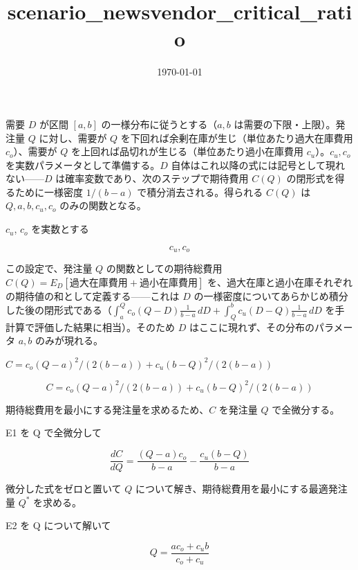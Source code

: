 \documentclass[dvipdfmx,a4paper,11pt]{jsarticle}
\title{scenario\_newsvendor\_critical\_ratio}
\date{\today}
\begin{document}
\maketitle

需要 $D$ が区間 $[a,b]$ の一様分布に従うとする（$a,b$ は需要の下限・上限）。発注量 $Q$ に対し、需要が $Q$ を下回れば余剰在庫が生じ（単位あたり過大在庫費用 $c_o$）、需要が $Q$ を上回れば品切れが生じる（単位あたり過小在庫費用 $c_u$）。$c_u,c_o$ を実数パラメータとして準備する。$D$ 自体はこれ以降の式には記号として現れない——$D$ は確率変数であり、次のステップで期待費用 $C(Q)$ の閉形式を得るために一様密度 $1/(b-a)$ で積分消去される。得られる $C(Q)$ は $Q,a,b,c_u,c_o$ のみの関数となる。

$c_u$, $c_o$ を実数とする

\[
  c_u, c_o
\]

この設定で、発注量 $Q$ の関数としての期待総費用 $C(Q)=E_D[\text{過大在庫費用}+\text{過小在庫費用}]$ を、過大在庫と過小在庫それぞれの期待値の和として定義する——これは $D$ の一様密度についてあらかじめ積分した後の閉形式である（$\int_a^Q c_o(Q-D)\frac1{b-a}\,dD+\int_Q^b c_u(D-Q)\frac1{b-a}\,dD$ を手計算で評価した結果に相当）。そのため $D$ はここに現れず、その分布のパラメータ $a,b$ のみが現れる。

$C = c_o (Q - a)^2 / (2 (b - a)) + c_u (b - Q)^2 / (2 (b - a))$

\begin{equation}
  C = c_o (Q - a)^2 / (2 (b - a)) + c_u (b - Q)^2 / (2 (b - a))
  \label{eq:E1}
\end{equation}

期待総費用を最小にする発注量を求めるため、$C$ を発注量 $Q$ で全微分する。

E1 を Q で全微分して

\begin{equation}
  \frac{dC}{dQ} = \frac{\left(Q-a\right) c_{o}}{b-a}-\frac{c_{u} \left(b-Q\right)}{b-a}
  \label{eq:E2}
\end{equation}

微分した式をゼロと置いて $Q$ について解き、期待総費用を最小にする最適発注量 $Q^*$ を求める。

E2 を Q について解いて

\begin{equation}
  Q = \frac{a c_{o}+c_{u} b}{c_{o}+c_{u}}
  \label{eq:E3}
\end{equation}
\end{document}
